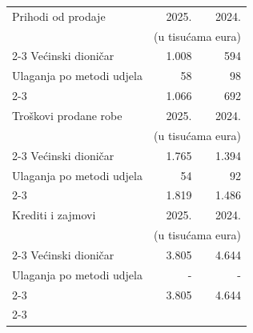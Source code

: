 \documentclass[a4paper,10pt]{article}
\begin{document}
\vspace{1em}
{\small
\begin{tabular}{@{}p{8cm}rr@{}}
Prihodi od prodaje & 2025. & 2024. \\
 & \multicolumn{2}{c}{(u tisućama eura)} \\ \cline{2-3}
Većinski dioničar & 1.008 & 594 \\
Ulaganja po metodi udjela & 58 & 98 \\ \cline{2-3}
 & 1.066 & 692 \\[1.5em]
Troškovi prodane robe & 2025. & 2024. \\
 & \multicolumn{2}{c}{(u tisućama eura)} \\ \cline{2-3}
Većinski dioničar & 1.765 & 1.394 \\
Ulaganja po metodi udjela & 54 & 92 \\ \cline{2-3}
 & 1.819 & 1.486 \\[1.5em]
Krediti i zajmovi & 2025. & 2024. \\
 & \multicolumn{2}{c}{(u tisućama eura)} \\ \cline{2-3}
Većinski dioničar & 3.805 & 4.644 \\
Ulaganja po metodi udjela & - & - \\ \cline{2-3}
 & 3.805 & 4.644 \\ \cline{2-3}
\end{tabular}}
\end{document}
